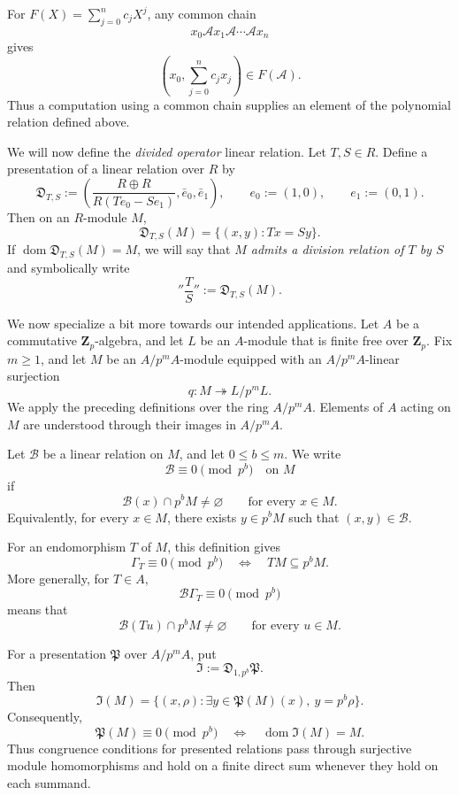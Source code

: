 \documentclass[11pt]{article}
\theoremstyle{plain}
\theoremstyle{definition}
\theoremstyle{remark}
\numberwithin{equation}{section}
\begin{document}
For \(F(X)=\sum_{j=0}^n c_jX^j\), any common chain \[ x_0\mathcal A x_1\mathcal A\cdots\mathcal A x_n \] gives \[ \left(x_0,\sum_{j=0}^n c_jx_j\right)\in F(\mathcal A). \] Thus a computation using a common chain supplies an element of the polynomial relation defined above.

We will now define the \emph{divided operator} linear relation. Let $T,S \in R$. Define a presentation of a linear relation over $R$ by \[\mathfrak D_{T,S} := \left(\frac{R \oplus R}{R(Te_0 -Se_1)}, \bar e_0, \bar e_1\right), \qquad e_0 := (1,0), \qquad e_1 := (0,1).\] Then on an $R$-module $M$, \[\mathfrak D_{T,S}(M) = \{(x,y): Tx = Sy\}.\] If $\operatorname{dom} \mathfrak D_{T,S}(M) = M$, we will say that \emph{$M$ admits a division relation of $T$ by $S$} and symbolically write \[''\frac{T}{S}'' := \mathfrak D_{T,S}(M).\] 

We now specialize a bit more towards our intended applications. Let \(A\) be a commutative \(\mathbf Z_p\)-algebra, and let \(L\) be an \(A\)-module that is finite free over \(\mathbf Z_p\). Fix \(m\geq1\), and let \(M\) be an \(A/p^mA\)-module equipped with an \(A/p^mA\)-linear surjection \[ q:M\twoheadrightarrow L/p^mL. \] We apply the preceding definitions over the ring \(A/p^mA\).
Elements of \(A\) acting on \(M\) are understood through their images in \(A/p^mA\).

Let \(\mathcal B\) be a linear relation on \(M\), and let \(0\leq b\leq m\). We write \[ \mathcal B\equiv0\pmod{p^b}\quad\text{on }M \] if \[ \mathcal B(x)\cap p^bM\neq\varnothing \qquad\text{for every }x\in M. \] Equivalently, for every \(x\in M\), there exists \(y\in p^bM\) such that \((x,y)\in\mathcal B\). 

For an endomorphism \(T\) of \(M\), this definition gives \[ \Gamma_T\equiv0\pmod{p^b} \quad\Longleftrightarrow\quad TM\subseteq p^bM. \] More generally, for \(T\in A\), \[ \mathcal B\Gamma_T\equiv0\pmod{p^b} \] means that \[ \mathcal B(Tu)\cap p^bM\neq\varnothing \qquad\text{for every }u\in M. \]

For a presentation \(\mathfrak P\) over \(A/p^mA\), put \[ \mathfrak I:=\mathfrak D_{1,p^b}\mathfrak P. \] Then \[ \mathfrak I(M) = \{(x,\rho):\exists y\in\mathfrak P(M)(x),\ y=p^b\rho\}. \] Consequently, \[ \mathfrak P(M)\equiv0\pmod{p^b} \quad\Longleftrightarrow\quad \operatorname{dom}\mathfrak I(M)=M. \] Thus congruence conditions for presented relations pass through surjective module homomorphisms and hold on a finite direct sum whenever they hold on each summand.
\end{document}
